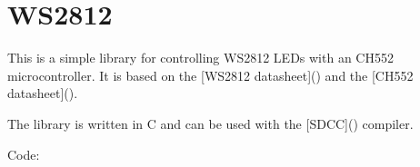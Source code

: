 \documentclass[letterpaper,10pt,english]{sphinxmanual}
\begin{document}
\sphinxstepscope


\chapter{WS2812}
\label{\detokenize{ws2812:ws2812}}\label{\detokenize{ws2812::doc}}
\sphinxAtStartPar
This is a simple library for controlling WS2812 LEDs with an CH552 microcontroller. It is based on the
{[}WS2812 datasheet{]}() and the
{[}CH552 datasheet{]}().

\sphinxAtStartPar
The library is written in C and can be used with the {[}SDCC{]}() compiler.

\sphinxAtStartPar
Code:
\end{document}
